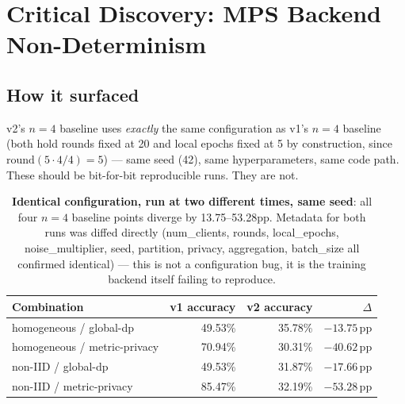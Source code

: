 \documentclass[11pt]{article}
\newcommand{\pp}{\,\text{pp}}
\begin{document}
\section{Critical Discovery: MPS Backend Non-Determinism}
\label{sec:mps}

\subsection{How it surfaced}

v2's $n{=}4$ baseline uses \emph{exactly} the same configuration as v1's $n{=}4$ baseline
(both hold rounds fixed at 20 and local epochs fixed at 5 by construction, since
$\text{round}(5 \cdot 4/4) = 5$) --- same seed (42), same hyperparameters, same code path. These
should be bit-for-bit reproducible runs. They are not.

\begin{table}[h]
\centering
\small
\begin{tabular}{lrrr}
\toprule
Combination & v1 accuracy & v2 accuracy & $\Delta$ \\
\midrule
homogeneous / global-dp        & 49.53\% & 35.78\% & $-13.75\pp$ \\
homogeneous / metric-privacy   & 70.94\% & 30.31\% & $-40.62\pp$ \\
non-IID / global-dp            & 49.53\% & 31.87\% & $-17.66\pp$ \\
non-IID / metric-privacy       & 85.47\% & 32.19\% & $-53.28\pp$ \\
\bottomrule
\end{tabular}
\caption{\textbf{Identical configuration, run at two different times, same seed}: all four $n{=}4$
baseline points diverge by 13.75--53.28pp. Metadata for both runs was diffed directly (num\_clients,
rounds, local\_epochs, noise\_multiplier, seed, partition, privacy, aggregation, batch\_size all
confirmed identical) --- this is not a configuration bug, it is the training backend itself failing
to reproduce.}
\label{tab:mps-proof}
\end{table}
\end{document}
